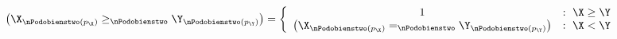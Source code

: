 \documentclass[a4paper,twoside,12pt]{book}
\begin{document}
\begin{align}
	\left(\X_{\nPodobienstwo(p_{\X})} \ge_{\nPodobienstwo} \Y_{\nPodobienstwo(p_{\Y})}\right) = \left\{ \begin{array}{cl}
	1 & : \  \X \ge \Y \\
	\left(\X_{\nPodobienstwo(p_{\X})} =_{\nPodobienstwo} \Y_{\nPodobienstwo(p_{\Y})}\right) & : \ \X < \Y
	\end{array} \right.
\end{align}








\end{document}
